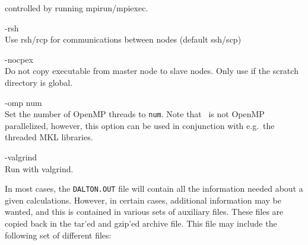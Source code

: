 \begin{list}{--}{}
  controlled by running mpirun/mpiexec.
\item[-rsh \hfill] \hfill \\
  Use rsh/rcp for communications between nodes (default ssh/scp)
\item[-nocpex \hfill] \hfill \\
  Do not copy executable from master node to slave nodes. Only use if the scratch directory is global.
\item[-omp num\hfill] \hfill \\
  Set the number of OpenMP threads to \verb|num|. Note that \dalton\ is not OpenMP
  parallelized, however, this option can be used in conjunction with e.g.\ the
  threaded MKL libraries.
\item[-valgrind \hfill] \hfill \\
  Run with valgrind.
\end{list}

In most cases, the \verb|DALTON.OUT| file will contain all the
information needed about a given calculations. However, in certain
cases, additional information may be wanted, and this is contained
in various sets of auxiliary files. These files are copied back in the
tar'ed and gzip'ed archive file. This file may include the following set of
different files:


